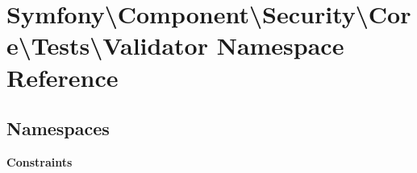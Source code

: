 \section{Symfony\textbackslash{}Component\textbackslash{}Security\textbackslash{}Core\textbackslash{}Tests\textbackslash{}Validator Namespace Reference}
\label{namespace_symfony_1_1_component_1_1_security_1_1_core_1_1_tests_1_1_validator}
\subsection*{Namespaces}
\begin{DoxyCompactItemize}
\item 
 {\bf Constraints}
\end{DoxyCompactItemize}
